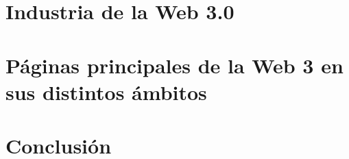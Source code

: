\section{Industria de la Web 3.0}


\section{Páginas principales de la Web 3 en sus distintos ámbitos}


\section{Conclusión}
